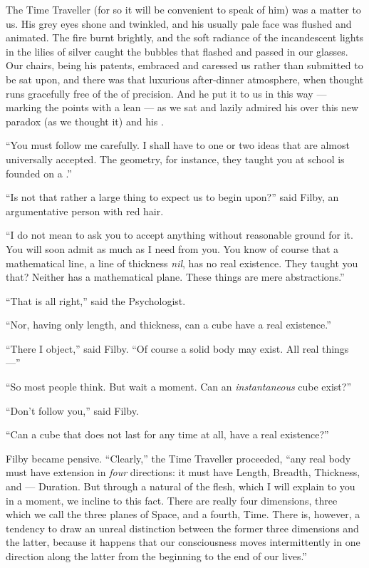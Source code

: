 \documentclass{fiche}
\begin{document}
\begin{texte}
The Time Traveller (for so it will be convenient to speak of him) was
 a 
matter to us. His grey eyes shone and twinkled, and his usually pale face was flushed and
animated. The fire burnt brightly, and the soft radiance of the incandescent lights in the
lilies of silver caught the bubbles that flashed and passed in our glasses. Our chairs, being
his patents, embraced and caressed us rather than submitted to be sat upon, and there was
that luxurious after-dinner atmosphere, when thought runs gracefully free of the
 of precision. And he put it to us in this way ---
marking the points with a lean  --- as we sat and lazily
admired his  over this new paradox (as we
thought it) and his .

``You must follow me carefully. I shall have to  one or two ideas that are almost universally accepted. The geometry, for instance,
they taught you at school is founded on a .''

``Is not that rather a large thing to expect us to begin upon?'' said Filby, an
argumentative person with red hair.

``I do not mean to ask you to accept anything without reasonable ground for it. You will soon
admit as much as I need from you. You know of course that a mathematical line, a line of
thickness \emph{nil}, has no real existence. They taught you that? Neither has a mathematical
plane. These things are mere abstractions.''

``That is all right,'' said the Psychologist.

``Nor, having only length,  and thickness, can a cube have a
real existence.''

``There I object,'' said Filby. ``Of course a solid body may exist. All real things ---''

``So most people think. But wait a moment. Can an \emph{instantaneous} cube exist?''

``Don't follow you,'' said Filby.

``Can a cube that does not last for any time at all, have a real existence?''

Filby became pensive. ``Clearly,'' the Time Traveller proceeded, ``any real body must have
extension in \emph{four} directions: it must have Length, Breadth, Thickness, and ---
Duration. But through a natural  of
the flesh, which I will explain to you in a moment, we incline to
 this fact. There are really four
dimensions, three which we call the three planes of Space, and a fourth, Time. There is,
however, a tendency to draw an unreal distinction between the former three dimensions and the
latter, because it happens that our consciousness moves intermittently in one direction along
the latter from the beginning to the end of our lives.''


\end{texte}
\end{document}
